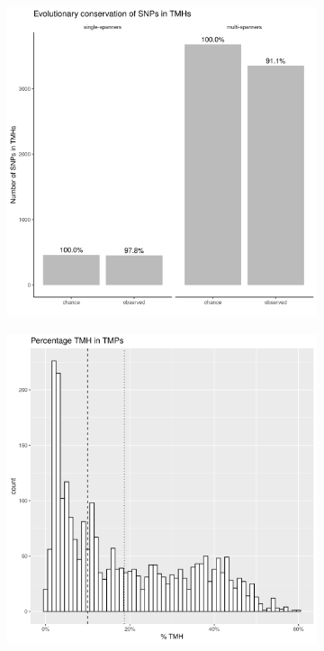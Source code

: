 \begin{figure}
  \centering
  \begin{subfigure}[t]{0.45\textwidth}
    \centering
    \caption{}
    \includegraphics[width=\linewidth]{ncbi_peregrine_results/fig_conservation_per_spanner.png}
    \label{fig:conservation_per_spanner}
  \end{subfigure}
  \hfill
  \begin{subfigure}[t]{0.45\textwidth}
    \centering
    \caption{}
    \includegraphics[width=\linewidth]{ncbi_peregrine_results/fig_f_tmh_ncbi.png}
    \label{fig:f_tmh_ncbi_per_spanner}
  \end{subfigure}  


\end{figure}

